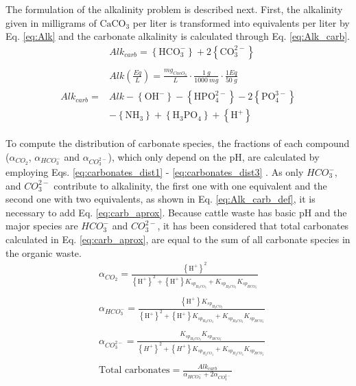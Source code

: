 \begin{refsection}[referencesCh3]
The formulation of the alkalinity problem is described next. First, the alkalinity given in milligrams of $\text{CaCO}_{3}$ per liter is transformed into equivalents per liter by Eq. \ref{eq:Alk} and the carbonate alkalinity is calculated through Eq. \ref{eq:Alk_carb}.
\begin{align}
&  Alk_{carb}= \left\{\text{HCO}_{3}^{-}\right\} + 2\left\{\text{CO}_{3}^{2-}\right\} \label{eq:Alk_carb_def}\\
\nonumber \\
& Alk \left(\frac{Eq}{L}\right) = \frac{mg_{CacO_{3}}}{L} \cdot \frac{1 \ g}{1000 \ mg} \cdot \frac{1 Eq}{50 \ g} \label{eq:Alk}
\end{align}
\begin{align}
\begin{split}
Alk_{carb}=&Alk-\left\{ \text{OH}^{-} \right\}-\left\{ \text{HPO}_{4}^{2-} \right\}- 2\left\{ \text{PO}_{4}^{3-}\right\} \\&-\left\{ \text{NH}_{3} \right\}+\left\{ \text{H}_{3}\text{PO}_{4} \right\}+\left\{ \text{H}^{+} \right\} \label{eq:Alk_carb}
\end{split}
\end{align}

To compute the distribution of carbonate species, the fractions of each compound ($\alpha_{CO_2}$, $\alpha_{HCO_{3}^{-}}$ and $\alpha_{CO_{3}^{2-}}$), which only depend on the pH, are calculated by employing Eqs. \ref{eq:carbonates_dist1} - \ref{eq:carbonates_dist3} \citep{WolfGladrow}. As only $HCO_{3}^{-}$, and $CO_{3}^{2-}$ contribute to alkalinity, the first one with one equivalent and the second one with two equivalents, as shown in Eq. \ref{eq:Alk_carb_def}, it is necessary  to add Eq. \ref{eq:carb_aprox}. Because cattle waste has basic pH and the major species are $HCO_{3}^{-}$ and $CO_{3}^{2-}$, it has been considered that total carbonates calculated in Eq. \ref{eq:carb_aprox}, are equal to the sum of all carbonate species in the organic waste.
\begin{align}
& \alpha_{CO_2} = \frac{\left\{ \text{H}^{+} \right\}^{2}}{\left\{ \text{H}^{+} \right\}^{2} + \left\{ \text{H}^{+} \right\}K_{sp_{H_{2}CO_{3}}}+K_{sp_{H_{2}CO_{3}}}K_{sp_{HCO_{3}^{-}}}} \label{eq:carbonates_dist1} \\
\nonumber \\
& \alpha_{HCO_{3}^{-}} = \frac{\left\{ \text{H}^{+} \right\}K_{sp_{H_{2}CO_{3}}}}{\left\{ \text{H}^{+} \right\}^{2} + \left\{ \text{H}^{+} \right\}K_{sp_{H_{2}CO_{3}}}+K_{sp_{H_{2}CO_{3}}}K_{sp_{HCO_{3}^{-}}}} \label{eq:carbonates_dist2} \\ 
\nonumber \\
& \alpha_{CO_{3}^{2-}} = \frac{K_{sp_{H_{2}CO_{3}}}K_{sp_{HCO_{3}^{-}}}}{\left\{ H^{+} \right\}^{2} + \left\{ H^{+} \right\}K_{sp_{H_{2}CO_{3}}}+K_{sp_{H_{2}CO_{3}}}K_{sp_{HCO_{3}^{-}}}} \label{eq:carbonates_dist3} \\
\nonumber \\
& \text{Total carbonates} = \frac{Alk_{carb}}{\alpha_{HCO_{3}^{-}} + 2 \alpha_{CO_{3}^{2-}}} \label{eq:carb_aprox}
\end{align}


\end{refsection}
